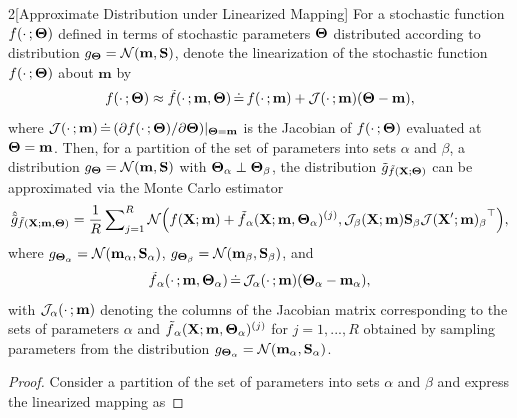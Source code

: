 \begin{appendices}
\begin{customproposition}{2}[Approximate Distribution under Linearized Mapping]
\label{app-prop:linearization_approx}
For a stochastic function $f(\cdot \,; \boldsymbol{\Theta})$ defined in terms of stochastic parameters $\boldsymbol{\Theta}$ distributed according to distribution \mbox{$g_{\boldsymbol{\Theta}} = \mathcal{N}(\mathbf{m}, \mathbf{S})$}, denote the linearization of the stochastic function $f(\cdot \,; \boldsymbol{\Theta})$ about $\mathbf{m}$ by
\begin{align*}
\label{app-eq:linearization}
    f(\cdot \,; \boldsymbol{\Theta}) \approx \smash{\tilde{f}}(\cdot \,; \mathbf{m}, \boldsymbol{\Theta}) \,\dot{=}\, f(\cdot \,; \mathbf{m}) + \mathcal{J}(\cdot \,; \mathbf{m})(\boldsymbol{\Theta} - \mathbf{m}) ,
    \end{align*}
where $\mathcal{J}(\cdot \,; \mathbf{m}) \,\dot{=}\, (\partial f(\cdot \,; \boldsymbol{\Theta}) / \partial \boldsymbol{\Theta})|_{\boldsymbol{\Theta} = \mathbf{m}}$ is the Jacobian of $f(\cdot \,; \boldsymbol{\Theta})$ evaluated at $\boldsymbol{\Theta} = \mathbf{m}$.
Then, for a partition of the set of parameters into sets $\alpha$ and $\beta$, a distribution \mbox{$g_{\boldsymbol{\Theta}} = \mathcal{N}(\mathbf{m}, \mathbf{S})$} with \mbox{$\boldsymbol{\Theta}_{\alpha} \perp \boldsymbol{\Theta}_{\beta}$}, the distribution $\tilde{g}_{\smash{\tilde{f}}(\mathbf X ; \boldsymbol{\Theta})}$ can be approximated via the Monte Carlo estimator
\begin{align}
    \hat{\tilde{g}}_{\smash{\tilde{f}}(\mathbf X ; \mathbf{m}, \boldsymbol{\Theta})}
    =
    \frac{1}{R} \sum\nolimits_{j=1}^{R} \mathcal{N}\Big(f(\mathbf X ; \mathbf{m}) + \smash{\tilde{f}}_{\alpha}(\mathbf X ; \mathbf{m}, \boldsymbol{\Theta}_{\alpha})^{(j)}, \mathcal{J}_{\beta}(\mathbf X ; \mathbf{m}) \mathbf{S}_{\beta} {\mathcal{J}(\mathbf X' ; \mathbf{m})_{\beta}}^\top \Big) ,
\end{align}
where \mbox{$g_{\boldsymbol{\Theta}_{\alpha}} = \mathcal{N}(\mathbf{m}_{\alpha}, \mathbf{S}_{\alpha})$}, $g_{\boldsymbol{\Theta}_{\beta}} = \mathcal{N}(\mathbf{m}_{\beta}, \mathbf{S}_{\beta})$, and
\begin{align}
    \smash{\tilde{f}}_{\alpha}(\cdot \,; \mathbf{m}, \boldsymbol{\Theta}_{\alpha}) \,\dot{=}\, \mathcal{J}_{\alpha}(\cdot \,; \mathbf{m})(\boldsymbol{\Theta}_{\alpha} - \mathbf{m}_{\alpha}) ,
\end{align}
with $\mathcal{J}_{\alpha}(\cdot \,; \mathbf{m})$ denoting the columns of the Jacobian matrix corresponding to the sets of parameters $\alpha$ and $\smash{\tilde{f}}_{\alpha}(\mathbf X ; \mathbf{m}, \boldsymbol{\Theta}_{\alpha})^{(j)}$ for $j=1,...,R$ obtained by sampling parameters from the distribution \mbox{$g_{\boldsymbol{\Theta}_{\alpha}} =  \mathcal{N}(\mathbf{m}_{\alpha}, \mathbf{S}_{\alpha})$}.
\end{customproposition}
\begin{proof}
Consider a partition of the set of parameters into sets $\alpha$ and $\beta$ and express the linearized mapping as

\end{proof}
\end{appendices}
